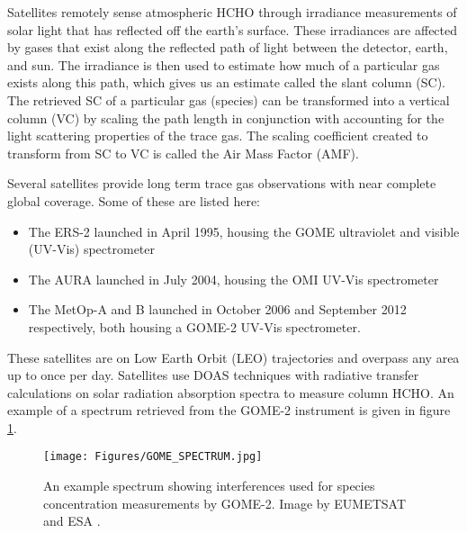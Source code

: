       Satellites remotely sense atmospheric HCHO through irradiance measurements of solar light that has reflected off the earth's surface. 
      These irradiances are affected by gases that exist along the reflected path of light between the detector, earth, and sun. 
      The irradiance is then used to estimate how much of a particular gas exists along this path, which gives us an estimate called the slant column (SC).
      The retrieved SC of a particular gas (species) can be transformed into a vertical column (VC) by scaling the path length in conjunction with accounting for the light scattering properties of the trace gas.
      The scaling coefficient created to transform from SC to VC is called the Air Mass Factor (AMF).
      
      Several satellites provide long term trace gas observations with near complete global coverage. 
      Some of these are listed here:
      \begin{itemize}
        \item  The ERS-2 launched in April 1995, housing the GOME ultraviolet and visible (UV-Vis) spectrometer
        \item The AURA launched in July 2004, housing the OMI UV-Vis spectrometer
        \item The MetOp-A and B launched in October 2006 and September 2012 respectively, both housing a GOME-2 UV-Vis spectrometer.
      \end{itemize}
      These satellites are on Low Earth Orbit (LEO) trajectories and overpass any area up to once per day.
      Satellites use DOAS techniques with radiative transfer calculations on solar radiation absorption spectra to measure column HCHO.
      An example of a spectrum retrieved from the GOME-2 instrument is given in figure \ref{LR:HCHO:Sat:fig_GOME_products}.
      
      \begin{figure}
        \texttt{[image: Figures/GOME\_SPECTRUM.jpg]}
        \caption{%
          An example spectrum showing interferences used for species concentration measurements by GOME-2. Image by EUMETSAT and ESA \parencite{GOME2Image}.
          }
        \label{LR:HCHO:Sat:fig_GOME_products}
      \end{figure}
      

